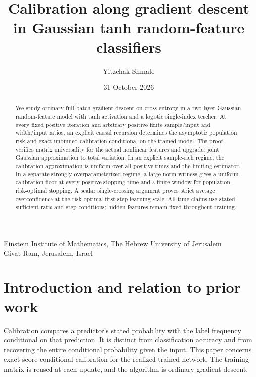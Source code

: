 \documentclass[
  11pt,
  a4paper,
]{article}
\title{Calibration along gradient descent in Gaussian tanh
random-feature classifiers}
\author{Yitzchak Shmalo}
\date{31 October 2026}
\begin{document}
\maketitle

\begin{center}
\small Einstein Institute of Mathematics, The Hebrew University of Jerusalem\\
Givat Ram, Jerusalem, Israel
\end{center}

\begin{abstract}
We study ordinary full-batch gradient descent on cross-entropy in a
two-layer Gaussian random-feature model with tanh activation and a
logistic single-index teacher. At every fixed positive iteration and
arbitrary positive finite sample/input and width/input ratios, an explicit
causal recursion determines the asymptotic population risk and exact
unbinned calibration conditional on the trained model. The proof verifies
matrix universality for the actual nonlinear features and upgrades joint
Gaussian approximation to total variation. In an explicit sample-rich
regime, the calibration approximation is uniform over all positive times
and the limiting estimator. In a separate strongly overparameterized
regime, a large-norm witness gives a uniform calibration floor at every
positive stopping time and a finite window for population-risk-optimal
stopping. A scalar single-crossing argument proves strict average
overconfidence at the risk-optimal first-step learning scale. All-time
claims use stated sufficient ratio and step conditions; hidden features
remain fixed throughout training.
\end{abstract}

\clearpage
\setcounter{tocdepth}{1}
\tableofcontents
\clearpage

\hypertarget{introduction-and-relation-to-prior-work}{%
\section{Introduction and relation to prior
work}\label{introduction-and-relation-to-prior-work}}

Calibration compares a predictor's stated probability with the label
frequency conditional on that prediction. It is distinct from
classification accuracy and from recovering the entire conditional
probability given the input. This paper concerns exact score-conditional
calibration for the realized trained network. The training matrix is
reused at each update, and the algorithm is ordinary gradient descent.
\end{document}
